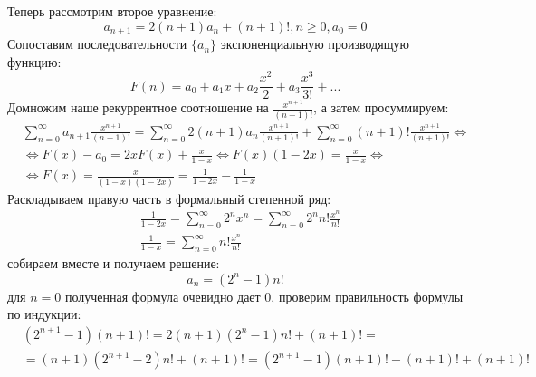 \documentclass[a4paper,12pt]{article}
\begin{document}
\begin{Solution}
Теперь рассмотрим второе уравнение:
\[
	a_{n+1} = 2 \left(n+1\right) a_n + \left(n+1\right)!, n \ge 0, a_0 = 0
\]
Сопоставим последовательности $\{a_n\}$ экспоненциальную производящую функцию:
\[
	F\left(n\right) = a_0 + a_1 x + a_2 \frac{x^2}{2} + a_3 \frac{x^3}{3!} + ...
\]
Домножим наше рекуррентное соотношение на $\frac{x^{n+1}}{\left(n+1\right)!}$, а затем просуммируем:
\[
	\begin{split}
		& \sum_{n=0}^{\infty} a_{n+1} \frac{x^{n+1}}{\left(n+1\right)!} = \sum_{n=0}^{\infty} 2 \left(n+1\right) a_n \frac{x^{n+1}}{\left(n+1\right)!} + \sum_{n=0}^{\infty} \left(n+1\right)!\frac{x^{n+1}}{\left(n+1\right)!} \Leftrightarrow \\
		& \Leftrightarrow F\left(x\right) - a_0 = 2 x F\left(x\right) + \frac{x}{1 - x} \Leftrightarrow F\left(x\right) \left(1 - 2x\right) = \frac{x}{1 - x} \Leftrightarrow \\
		& \Leftrightarrow F \left(x\right) = \frac{x}{\left(1 - x\right)\left(1 - 2 x\right)} = \frac{1}{1 - 2 x} - \frac{1}{1 - x}
	\end{split}
\]
Раскладываем правую часть в формальный степенной ряд:
\[
	\begin{split}
		& \frac{1}{1 - 2 x} = \sum_{n=0}^{\infty} 2^n x^n = \sum_{n=0}^{\infty} 2^n n! \frac{x^n}{n!} \\
		& \frac{1}{1 - x} = \sum_{n=0}^{\infty} n! \frac{x^n}{n!}
	\end{split}
\]
собираем вместе и получаем решение:
\[
	a_n = \left( 2^n - 1 \right) n!
\]
для $n=0$ полученная формула очевидно дает 0, проверим правильность формулы по индукции:
\[
	\begin{split}
		& \left(2^{n+1}-1\right)\left(n+1\right)! = 2 \left(n+1\right)\left(2^n-1\right)n! + \left(n+1\right)! = \\ 
		& = \left(n+1\right)\left(2^{n+1}-2\right)n! + \left(n+1\right)! = \left(2^{n+1}-1\right)\left(n+1\right)! - \left(n+1\right)! + \left(n+1\right)!
	\end{split}
\]
\end{Solution}
\end{document}
